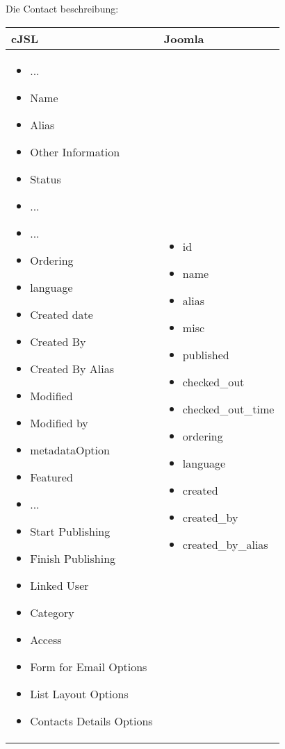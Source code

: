 Die Contact beschreibung:

\begin{minipage}{0.7\textwidth}
\begin{tabular}{|p{} | p{}|}
\hline
\textbf{cJSL} & \textbf{Joomla} \\ 
\hline
\begin{itemize}
\item ...
\item  Name
\item  Alias
\item  Other Information
\item  Status
\item  ...
\item  ...
\item  Ordering
\item  language
\item  Created date
\item  Created By
\item  Created By Alias
\item  Modified
\item  Modified by
\item  metadataOption
\item  Featured
\item  ...
\item  Start Publishing
\item  Finish Publishing
\item  Linked User
\item  Category
\item  Access
\item  Form for Email Options
\item  List Layout Options
\item Contacts Details Options
\end{itemize}
 & 
\begin{itemize}
\item id
\item  name
\item  alias
\item   misc
\item  published
\item  checked\_out
\item  checked\_out\_time
\item  ordering
\item  language
\item  created
\item  created\_by
\item  created\_by\_alias

\end{itemize}
\end{tabular}
\end{minipage}
